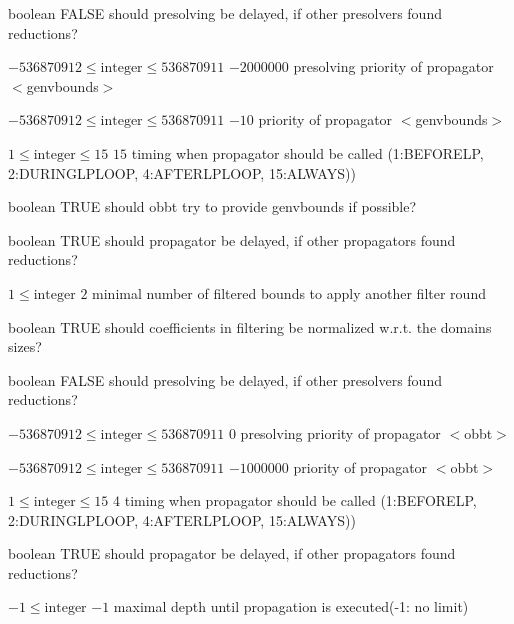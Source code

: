 %
{boolean}%
{FALSE}%
{should presolving be delayed, if other presolvers found reductions?}%
{}

%
{$-536870912\leq\textrm{integer}\leq536870911$}%
{$-2000000$}%
{presolving priority of propagator $<$genvbounds$>$}%
{}

%
{$-536870912\leq\textrm{integer}\leq536870911$}%
{$-10$}%
{priority of propagator $<$genvbounds$>$}%
{}

%
{$1\leq\textrm{integer}\leq15$}%
{$15$}%
{timing when propagator should be called (1:BEFORELP, 2:DURINGLPLOOP, 4:AFTERLPLOOP, 15:ALWAYS))}%
{}

%
{boolean}%
{TRUE}%
{should obbt try to provide genvbounds if possible?}%
{}

%
{boolean}%
{TRUE}%
{should propagator be delayed, if other propagators found reductions?}%
{}

%
{$1\leq\textrm{integer}$}%
{$2$}%
{minimal number of filtered bounds to apply another filter round}%
{}

%
{boolean}%
{TRUE}%
{should coefficients in filtering be normalized w.r.t. the domains sizes?}%
{}

%
{boolean}%
{FALSE}%
{should presolving be delayed, if other presolvers found reductions?}%
{}

%
{$-536870912\leq\textrm{integer}\leq536870911$}%
{$0$}%
{presolving priority of propagator $<$obbt$>$}%
{}

%
{$-536870912\leq\textrm{integer}\leq536870911$}%
{$-1000000$}%
{priority of propagator $<$obbt$>$}%
{}

%
{$1\leq\textrm{integer}\leq15$}%
{$4$}%
{timing when propagator should be called (1:BEFORELP, 2:DURINGLPLOOP, 4:AFTERLPLOOP, 15:ALWAYS))}%
{}

%
{boolean}%
{TRUE}%
{should propagator be delayed, if other propagators found reductions?}%
{}

%
{$-1\leq\textrm{integer}$}%
{$-1$}%
{maximal depth until propagation is executed(-1: no limit)}%
{}


